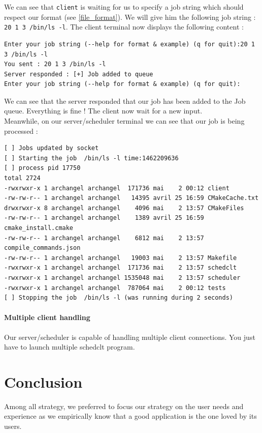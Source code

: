 \documentclass[a4paper,11pt]{article}
\begin{document}
We can see that \texttt{client} is waiting for us to specify a job string which should respect our format (see \ref{file_format}). We will give him the following job string : \texttt{20 1 3 /bin/ls -l}. The client terminal now displays the following content :

\begin{verbatim}
Enter your job string (--help for format & example) (q for quit):20 1 3 /bin/ls -l
You sent : 20 1 3 /bin/ls -l
Server responded : [+] Job added to queue
Enter your job string (--help for format & example) (q for quit):
\end{verbatim}

We can see that the server responded that our job has been added to the Job queue. Everything is fine ! The client now wait for a new input.\\

Meanwhile, on our server/scheduler terminal we can see that our job is being processed :

\begin{verbatim}
[ ] Jobs updated by socket
[ ] Starting the job  /bin/ls -l time:1462209636
[ ] process pid 17750
total 2724
-rwxrwxr-x 1 archangel archangel  171736 mai    2 00:12 client
-rw-rw-r-- 1 archangel archangel   14395 avril 25 16:59 CMakeCache.txt
drwxrwxr-x 8 archangel archangel    4096 mai    2 13:57 CMakeFiles
-rw-rw-r-- 1 archangel archangel    1389 avril 25 16:59 cmake_install.cmake
-rw-rw-r-- 1 archangel archangel    6812 mai    2 13:57 compile_commands.json
-rw-rw-r-- 1 archangel archangel   19003 mai    2 13:57 Makefile
-rwxrwxr-x 1 archangel archangel  171736 mai    2 13:57 schedclt
-rwxrwxr-x 1 archangel archangel 1535048 mai    2 13:57 scheduler
-rwxrwxr-x 1 archangel archangel  787064 mai    2 00:12 tests
[ ] Stopping the job  /bin/ls -l (was running during 2 seconds)
\end{verbatim}

\paragraph{Multiple client handling}
Our server/scheduler is capable of handling multiple client connections. You just have to launch multiple schedclt program.

\clearpage

\section{Conclusion}

Among all strategy, we preferred to focus our strategy on the user needs and experience as we empirically know that a good application is the one loved by its users.

\clearpage




\newpage

\end{document}
